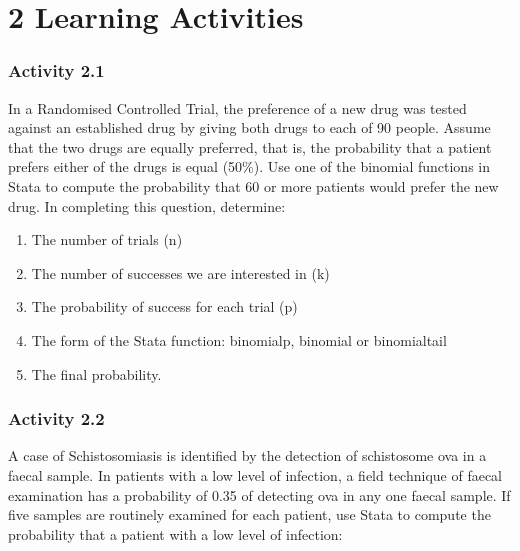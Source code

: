 \documentclass[
]{memoir}
\providecommand{\tightlist}{%
  \setlength{\itemsep}{0pt}\setlength{\parskip}{0pt}}
\begin{document}
\hypertarget{learning-activities-1}{%
\chapter*{\texorpdfstring{\textbf{2} Learning Activities}{2 Learning Activities}}\label{learning-activities-1}}

\hypertarget{activity-2.1}{%
\subsection*{Activity 2.1}\label{activity-2.1}}

In a Randomised Controlled Trial, the preference of a new drug was tested against an established drug by giving both drugs to each of 90 people. Assume that the two drugs are equally preferred, that is, the probability that a patient prefers either of the drugs is equal (50\%). Use one of the binomial functions in Stata to compute the probability that 60 or more patients would prefer the new drug. In completing this question, determine:

\begin{enumerate}
\def\labelenumi{\alph{enumi})}
\tightlist
\item
  The number of trials (n)
\item
  The number of successes we are interested in (k)
\item
  The probability of success for each trial (p)
\item
  The form of the Stata function: binomialp, binomial or binomialtail
\item
  The final probability.
\end{enumerate}

\hypertarget{activity-2.2}{%
\subsection*{Activity 2.2}\label{activity-2.2}}

A case of Schistosomiasis is identified by the detection of schistosome ova in a faecal sample. In patients with a low level of infection, a field technique of faecal examination has a probability of 0.35 of detecting ova in any one faecal sample. If five samples are routinely examined for each patient, use Stata to compute the probability that a patient with a low level of infection:
\end{document}
